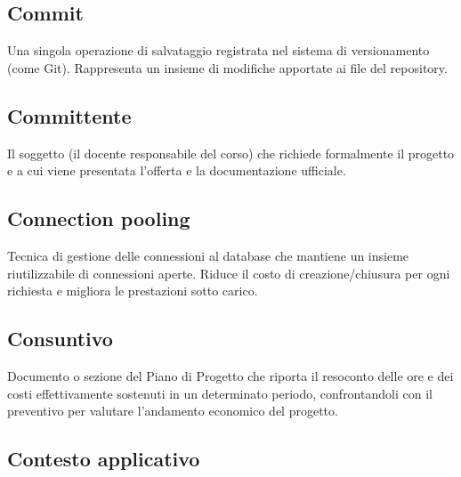\documentclass[a4paper, 11pt, oneside]{scrartcl} %
\begin{document}
\subsection*{Commit}


Una singola operazione di salvataggio registrata nel sistema di versionamento (come Git). Rappresenta un insieme di modifiche apportate ai file del repository.

\vspace{0.5cm}

\subsection*{Committente}


Il soggetto (il docente responsabile del corso) che richiede formalmente il progetto e a cui viene presentata l'offerta e la documentazione ufficiale.

\vspace{0.5cm}

\subsection*{Connection pooling}
Tecnica di gestione delle connessioni al database che mantiene un insieme riutilizzabile di connessioni aperte. Riduce il costo di creazione/chiusura per ogni richiesta e migliora le prestazioni sotto carico.
\vspace{0.5cm}

\subsection*{Consuntivo}
Documento o sezione del Piano di Progetto che riporta il resoconto delle ore e dei costi effettivamente sostenuti in un determinato periodo, confrontandoli con il preventivo per valutare l'andamento economico del progetto.
\vspace{0.5cm}

\subsection*{Contesto applicativo}

\end{document}
